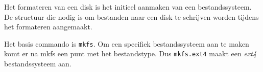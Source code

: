 Het formateren van een disk is het initieel aanmaken van een bestandssysteem. De structuur die nodig is om bestanden naar een disk te schrijven worden tijdens het formateren aangemaakt.

Het basis commando is \texttt{mkfs}. Om een specifiek bestandssysteem aan te maken komt er na mkfs een punt met het bestandstype. Dus \texttt{mkfs.ext4} maakt een \textit{ext4} bestandssysteem aan.

